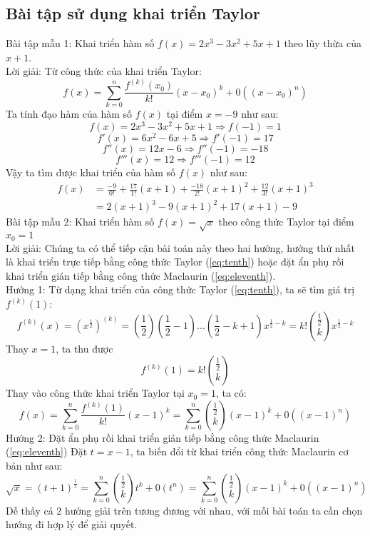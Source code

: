 \subsection{Bài tập sử dụng khai triển Taylor}
Bài tập mẫu 1: Khai triển hàm số $f(x)=2x^3-3x^2+5x+1$ theo lũy thừa của $x+1$.\\
Lời giải: Từ công thức của khai triển Taylor:
$$f(x)=\sum_{k=0}^n\frac{f^{(k)}(x_{0})}{k!}(x-x_{0})^k+0((x-x_{0})^n)$$
Ta tính đạo hàm của hàm số $f(x)$ tại điểm $x=-9$ như sau:
$$f(x)=2x^3-3x^2+5x+1\Rightarrow f(-1)=1$$
$$f'(x)=6x^2-6x+5\Rightarrow f'(-1)=17$$
$$f''(x)=12x-6\Rightarrow f''(-1)=-18$$
$$f'''(x)=12\Rightarrow f'''(-1)=12$$
Vậy ta tìm được khai triển của hàm số $f(x)$ như sau:
\begin{equation*}
\begin{split}
f(x)&=\frac{-9}{0!}+\frac{17}{1!}(x+1)+\frac{-18}{2!}(x+1)^2+\frac{12}{3!}(x+1)^3\\&=2(x+1)^3-9(x+1)^2+17(x+1)-9
\end{split}
\end{equation*}
Bài tập mẫu 2: Khai triển hàm số $f(x)=\sqrt{x}$ theo công thức Taylor tại điểm $x_{0}=1$\\
Lời giải: Chúng ta có thể tiếp cận bài toán này theo hai hướng, hướng thứ nhất là khai triển trực tiếp bằng công thức Taylor (\ref{eq:tenth}) hoặc đặt ẩn phụ rồi khai triển
gián tiếp bằng công thức Maclaurin (\ref{eq:eleventh}).\\
Hướng 1: Từ dạng khai triển của công thức Taylor (\ref{eq:tenth}), ta sẽ tìm giá trị $f^{(k)}(1)$:
$$f^{(k)}(x)=(x^{\frac{1}{2}})^{(k)}=\left(\frac{1}{2}\right)\left(\frac{1}{2}-1\right)...\left(\frac{1}{2}-k+1\right)x^{\frac{1}{2}-k}=k!\binom{\frac{1}{2}}{k}x^{\frac{1}{2}-k}$$
Thay $x=1$, ta thu được $$f^{(k)}(1)=k!\binom{\frac{1}{2}}{k}$$
Thay vào công thức khai triển Taylor tại $x_{0}=1$, ta có:
\begin{equation*}
f(x)=\sum_{k=0}^{n}\frac{f^{(k)}(1)}{k!}(x-1)^k=\sum_{k=0}^{n}\binom{\frac{1}{2}}{k}(x-1)^k+0((x-1)^n)
\end{equation*}
Hướng 2: Đặt ẩn phụ rồi khai triển gián tiếp bằng công thức Maclaurin (\ref{eq:eleventh})
Đặt $t=x-1$, ta biến đổi từ khai triển công thức Maclaurin cơ bản như sau:
\begin{equation*}
\sqrt{x}=(t+1)^{\frac{1}{2}}=\sum_{k=0}^{n}\binom{\frac{1}{2}}{k}t^k+0(t^n)=\sum_{k=0}^{n}\binom{\frac{1}{2}}{k}(x-1)^k+0((x-1)^n)
\end{equation*}
Dễ thấy cả 2 hướng giải trên tương đương với nhau, với mỗi bài toán ta cần chọn hướng đi hợp lý để giải quyết.
